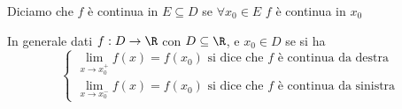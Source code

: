     Diciamo che $ f $ è continua in $ E \subseteq D$ se $ \forall x_0 \in E $ $ f $ è continua in $ x_0 $

    \esempi{}{
    }

    In generale dati $ f:D\to \R $ con $ D \subseteq \R $, e $ x_0 \in D $ se si ha 
    \[\begin{cases}
        \displaystyle\lim_{x\to x_0^+} f(x) = f(x_0)\text{ si dice che } f \text{ è continua da destra}\\
        \displaystyle\lim_{x\to x_0^-} f(x) = f(x_0)\text{ si dice che } f \text{ è continua da sinistra}
    \end{cases}\]